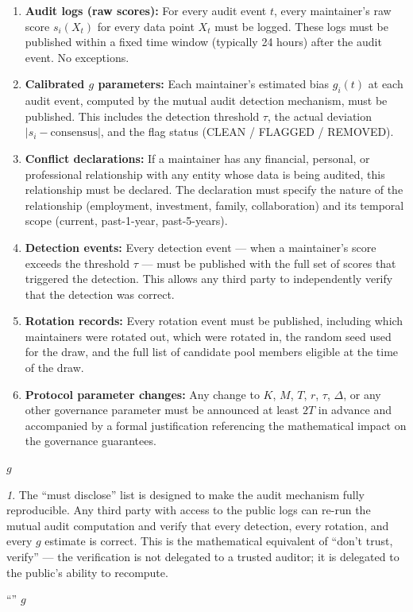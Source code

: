 \documentclass[12pt,a4paper]{article}
\theoremstyle{remark}
\newtheorem{govnote}{}[section]
\newenvironment{govbox}{%
  \begin{center}
  \color{blue}
  \begin{minipage}{0.92\textwidth}
  \begin{govnote}
}{%
  \end{govnote}
  \end{minipage}
  \end{center}
}
\begin{document}
\begin{enumerate}[label=\textbf{MD-\arabic*:}, leftmargin=*]
    \item \textbf{Audit logs (raw scores):} For every audit event $t$, every
          maintainer's raw score $s_i(X_t)$ for every data point $X_t$ must be
          logged. These logs must be published within a fixed time window
          (typically 24 hours) after the audit event. No exceptions.
    \item \textbf{Calibrated $g$ parameters:} Each maintainer's estimated bias
          $g_i(t)$ at each audit event, computed by the mutual audit detection
          mechanism, must be published. This includes the detection threshold
          $\tau$, the actual deviation $|s_i - \text{consensus}|$, and the
          flag status (CLEAN / FLAGGED / REMOVED).
    \item \textbf{Conflict declarations:} If a maintainer has any financial,
          personal, or professional relationship with any entity whose data is
          being audited, this relationship must be declared. The declaration
          must specify the nature of the relationship (employment, investment,
          family, collaboration) and its temporal scope (current, past-1-year,
          past-5-years).
    \item \textbf{Detection events:} Every detection event — when a maintainer's
          score exceeds the threshold $\tau$ — must be published with the full
          set of scores that triggered the detection. This allows any third
          party to independently verify that the detection was correct.
    \item \textbf{Rotation records:} Every rotation event must be published,
          including which maintainers were rotated out, which were rotated in,
          the random seed used for the draw, and the full list of candidate pool
          members eligible at the time of the draw.
    \item \textbf{Protocol parameter changes:} Any change to $K$, $M$, $T$, $r$,
          $\tau$, $\Delta$, or any other governance parameter must be announced
          at least $2T$ in advance and accompanied by a formal justification
          referencing the mathematical impact on the governance guarantees.
\end{enumerate}

\noindent\textbf{}
$g$


\begin{govbox}
The ``must disclose'' list is designed to make the audit mechanism fully
reproducible. Any third party with access to the public logs can re-run the
mutual audit computation and verify that every detection, every rotation, and
every $g$ estimate is correct. This is the mathematical equivalent of
``don't trust, verify'' — the verification is not delegated to a trusted
auditor; it is delegated to the public's ability to recompute.

\begin{center}
\small\textbf{}
“”
$g$
\end{center}
\end{govbox}
\end{document}
